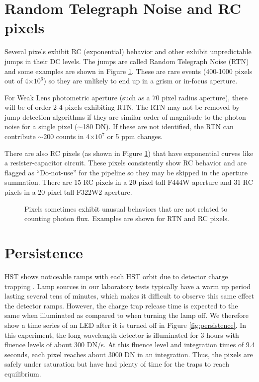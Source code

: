 \documentclass{aastex62}
\begin{document}
\clearpage

\section{Random Telegraph Noise and RC pixels}
Several pixels exhibit RC (exponential) behavior and other exhibit unpredictable jumps in their DC levels.
The jumps are called Random Telegraph Noise (RTN) and some examples are shown in Figure \ref{fig:RTNandRC}.
These are rare events (400-1000 pixels out of 4$\times 10^6$) so they are unlikely to end up in a grism or in-focus aperture.

For Weak Lens photometric aperture (such as a 70 pixel radius aperture), there will be of order 2-4 pixels exhibiting RTN.
The RTN may not be removed by jump detection algorithms if they are similar order of magnitude to the photon noise for a single pixel ($\sim$180 DN).
If these are not identified, the RTN can contribute $\sim$200 counts in 4$\times 10^7$ or 5 ppm changes.

There are also RC pixels (as shown in Figure \ref{fig:RTNandRC}) that have exponential curves like a resister-capacitor circuit.
These pixels consistently show RC behavior and are flagged as ``Do-not-use'' for the pipeline so they may be skipped in the aperture summation.
There are 15 RC pixels in a 20 pixel tall F444W aperture and 31 RC pixels in a 20 pixel tall F322W2 aperture.

\begin{figure}
\caption{Pixels sometimes exhibit unusual behaviors that are not related to counting photon flux.
Examples are shown for RTN and RC pixels.
}\label{fig:RTNandRC}
\end{figure}



\section{Persistence}\label{sec:persistence}
HST shows noticeable ramps with each HST orbit due to detector charge trapping \citep{zhou2017chargeTrap}.
Lamp sources in our laboratory tests typically have a warm up period lasting several tens of minutes, which makes it difficult to observe this same effect the detector ramps.
However, the charge trap release time is expected to the same when illuminated as compared to when turning the lamp off.
We therefore show a time series of an LED after it is turned off in Figure \ref{fig:persistence}.
In this experiment, the long wavelength detector is illuminated for 3 hours with fluence levels of about 300 DN/s.
At this fluence level and integration times of 9.4 seconds, each pixel reaches about 3000 DN in an integration.
Thus, the pixels are safely under saturation but have had plenty of time for the traps to reach equilibrium.
\end{document}

